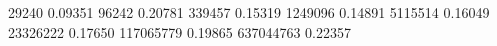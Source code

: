 29240        0.09351
96242        0.20781
339457       0.15319
1249096      0.14891
5115514      0.16049
23326222     0.17650
117065779    0.19865
637044763    0.22357